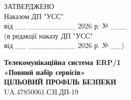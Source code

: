 \documentclass[10pt]{article}
\begin{document}
\begin{flushright}
ЗАТВЕРДЖЕНО\\
Наказом ДП "УСС"\\
від \_\_ \_\_\_\_\_\_\_\_\_ 2026 р. № \_\_\_\\
(в редакції наказу ДП "УСС"\\
від \_\_ \_\_\_\_\_\_\_\_\_ 2026 р. № \_\_)
\end{flushright}

\vspace{2cm}

\begin{center}
\textbf{\Large Телекомунікаційна система ERP/1}\\
\textbf{\Large «Повний набір сервісів»}\\
\vspace{1cm}
\textbf{\Large ЦІЛЬОВИЙ ПРОФІЛЬ БЕЗПЕКИ}\\
\vspace{0.5cm}
\large UA.47850061.СЗІ.ДП-19
\end{center}

\newpage
\end{document}
